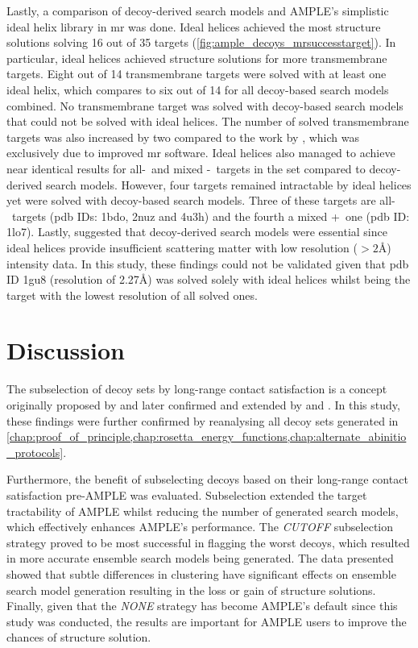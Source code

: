 Lastly, a comparison of decoy-derived search models and AMPLE's simplistic ideal helix library \cite{Thomas2015-wu} in \gls{mr} was done. Ideal helices achieved the most structure solutions solving 16 out of 35 targets (\cref{fig:ample_decoys_mrsuccesstarget}). In particular, ideal helices achieved structure solutions for more transmembrane targets. Eight out of 14 transmembrane targets were solved with at least one ideal helix, which compares to six out of 14 for all decoy-based search models combined. No transmembrane target was solved with decoy-based search models that could not be solved with ideal helices. The number of solved transmembrane targets was also increased by two compared to the work by \textcite{Thomas2017-sh}, which was exclusively due to improved \gls{mr} software. Ideal helices also managed to achieve near identical results for all-\textalpha\ and mixed \textalpha-\textbeta\ targets in the set compared to decoy-derived search models. However, four targets remained intractable by ideal helices yet were solved with decoy-based search models. Three of these targets are all-\textbeta\ targets (\gls{pdb} IDs: 1bdo, 2nuz and 4u3h) and the fourth a mixed \textalpha+\textbeta\ one (\gls{pdb} ID: 1lo7). Lastly, \textcite{Thomas2017-sh} suggested that decoy-derived search models were essential since ideal helices provide insufficient scattering matter with low resolution ($>2$\AA) intensity data. In this study, these findings could not be validated given that \gls{pdb} ID 1gu8 (resolution of 2.27\AA) was solved solely with ideal helices whilst being the target with the lowest resolution of all solved ones.

\section{Discussion}
The subselection of decoy sets by long-range contact satisfaction is a concept originally proposed by \textcite{Kosciolek2014-bt} and later confirmed and extended by \textcite{De_Oliveira2016-gj} and \textcite{Adhikari2018-lj}. In this study, these findings were further confirmed by reanalysing all decoy sets generated in \cref{chap:proof_of_principle,chap:rosetta_energy_functions,chap:alternate_abinitio_protocols}. 

Furthermore, the benefit of subselecting decoys based on their long-range contact satisfaction pre-AMPLE was evaluated. Subselection extended the target tractability of AMPLE whilst reducing the number of generated search models, which effectively enhances AMPLE's performance. The \textit{CUTOFF} subselection strategy proved to be most successful in flagging the worst decoys, which resulted in more accurate ensemble search models being generated. The data presented showed that subtle differences in clustering have significant effects on ensemble search model generation resulting in the loss or gain of structure solutions. Finally, given that the \textit{NONE} strategy has become AMPLE's default since this study was conducted, the results are important for AMPLE users to improve the chances of structure solution.

